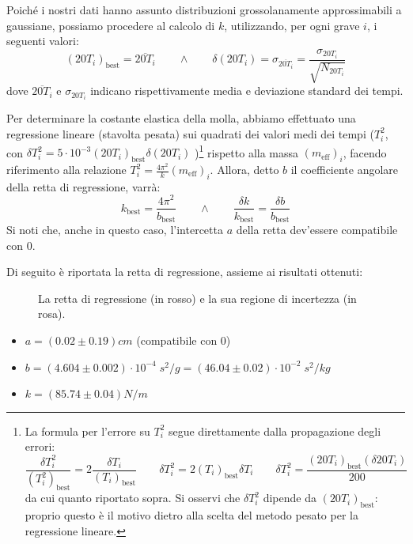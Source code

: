 \documentclass{article}
\begin{document}
Poiché i nostri dati hanno assunto distribuzioni grossolanamente
approssimabili a gaussiane, possiamo procedere al calcolo di $k$,
utilizzando, per ogni grave $i$, i seguenti valori:
\[
    \left(20T_i\right)_\text{best} = \overline{20T_i}
    \qquad\wedge\qquad
    \delta\left(20T_i\right) =
    \sigma_{\overline{20T_i}} =
    \frac{\sigma_{20T_i}}{\sqrt{N_{20T_i}}}
\]
dove $\overline{20T_i}$ e $\sigma_{20T_i}$ indicano rispettivamente
media e deviazione standard dei tempi.

Per determinare la costante elastica della molla, abbiamo effettuato
una regressione lineare (stavolta pesata) sui quadrati dei valori medi
dei tempi ($T_i^2$, con
$\delta T_i^2 = 5 \cdot 10^{-3} (20 T_i)_\text{best} \delta(20 T_i)$
)\footnote[2]{
    La formula per l'errore su $T_i^2$ segue direttamente dalla
    propagazione degli errori:
    \[
        \frac{\delta T_i^2}{\left(T_i^2\right)_\text{best}} = 2\frac{\delta T_i}{{\left(T_i\right)}_\text{best}}
        \qquad
        \delta T_i^2 = 2\left(T_i\right)_\text{best}\delta T_i
        \qquad
        \delta T_i^2 = \frac{\left(20T_i\right)_\text{best}(\delta 20T_i)}{200}
    \]
    da cui quanto riportato sopra.
    Si osservi che $\delta T_i^2$ dipende da
    $\left(20T_i\right)_\text{best}$:
    proprio questo è il motivo dietro alla scelta del metodo pesato
    per la regressione lineare.
} rispetto alla massa $\left(m_\text{eff}\right)_i$, facendo riferimento
alla relazione $T_i^2 = \frac{4\pi^2}{k} \left(m_\text{eff}\right)_i$. Allora, detto $b$ il
coefficiente angolare della retta di regressione, varrà:
\[
    k_\text{best}=\frac{4\pi^2}{b_\text{best}}
    \qquad\wedge\qquad
    \frac{\delta k}{k_\text{best}}=\frac{\delta b}{b_\text{best}}
\]
Si noti che, anche in questo caso, l'intercetta $a$ della retta dev'essere
compatibile con $0$.

Di seguito è riportata la retta di regressione, assieme ai risultati ottenuti:

\begin{figure}[H]
    \caption{
        La retta di regressione (in rosso)
        e la sua regione di incertezza (in rosa).
    }
\end{figure}

\begin{itemize}
    \item $a = \left(0.02\pm0.19\right)\unit{cm}$ (compatibile con 0)
    \item $
        b = \left(4.604\pm0.002\right)\cdot10^{-4}\;\unit{s^2\per g}
          = \left(46.04\pm0.02\right)\cdot10^{-2}\;\unit{s^2\per kg}
    $
    \item $k = \left(85.74\pm0.04\right)\unit{N\per m}$
\end{itemize}
\end{document}
